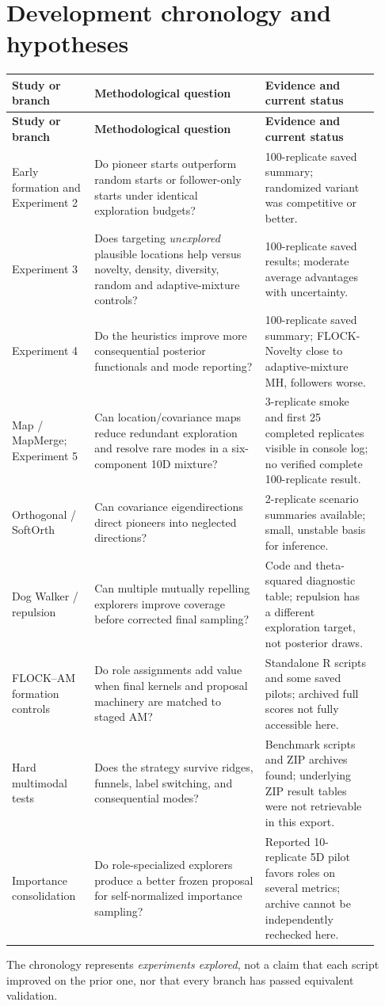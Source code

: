 \documentclass[11pt,letterpaper]{article}
\begin{document}
\section{Development chronology and hypotheses}
\small
\begin{longtable}{p{0.205\linewidth}p{0.425\linewidth}p{0.285\linewidth}}
\toprule
\textbf{Study or branch} & \textbf{Methodological question} & \textbf{Evidence and current status}\\
\midrule\endfirsthead
\toprule\textbf{Study or branch} & \textbf{Methodological question} & \textbf{Evidence and current status}\\\midrule\endhead
Early formation and Experiment 2 & Do pioneer starts outperform random starts or follower-only starts under identical exploration budgets? & 100-replicate saved summary; randomized variant was competitive or better.\\
Experiment 3 & Does targeting \emph{unexplored} plausible locations help versus novelty, density, diversity, random and adaptive-mixture controls? & 100-replicate saved results; moderate average advantages with uncertainty.\\
Experiment 4 & Do the heuristics improve more consequential posterior functionals and mode reporting? & 100-replicate saved summary; FLOCK-Novelty close to adaptive-mixture MH, followers worse.\\
Map / MapMerge; Experiment 5 & Can location/covariance maps reduce redundant exploration and resolve rare modes in a six-component 10D mixture? & 3-replicate smoke and first 25 completed replicates visible in console log; no verified complete 100-replicate result.\\
Orthogonal / SoftOrth & Can covariance eigendirections direct pioneers into neglected directions? & 2-replicate scenario summaries available; small, unstable basis for inference.\\
Dog Walker / repulsion & Can multiple mutually repelling explorers improve coverage before corrected final sampling? & Code and theta-squared diagnostic table; repulsion has a different exploration target, not posterior draws.\\
FLOCK--AM formation controls & Do role assignments add value when final kernels and proposal machinery are matched to staged AM? & Standalone R scripts and some saved pilots; archived full scores not fully accessible here.\\
Hard multimodal tests & Does the strategy survive ridges, funnels, label switching, and consequential modes? & Benchmark scripts and ZIP archives found; underlying ZIP result tables were not retrievable in this export.\\
Importance consolidation & Do role-specialized explorers produce a better frozen proposal for self-normalized importance sampling? & Reported 10-replicate 5D pilot favors roles on several metrics; archive cannot be independently rechecked here.\\
\bottomrule
\end{longtable}
\normalsize
The chronology represents \emph{experiments explored}, not a claim that each script improved on the prior one, nor that every branch has passed equivalent validation.
\end{document}
